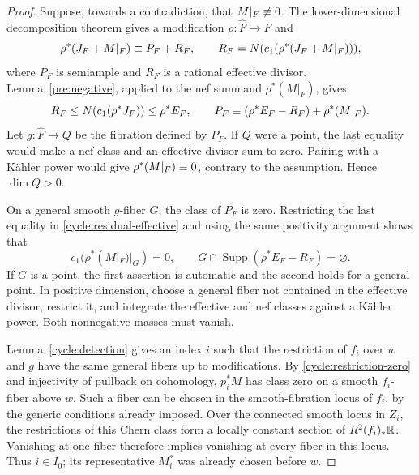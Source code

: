 \begin{proof}
Suppose, towards a contradiction, that $M|_F\not\equiv0$.  The
lower-dimensional decomposition theorem gives a modification
$\rho:\widehat F\to F$ and
\begin{equation}\label{cycle:inductive-decomposition}
 \rho^*(J_F+M|_F)\equiv P_F+R_F,
 \qquad R_F=N(c_1(\rho^*(J_F+M|_F))),
\end{equation}
where $P_F$ is semiample and $R_F$ is a rational effective divisor.
Lemma~\ref{pre:negative}, applied to the nef summand $\rho^*(M|_F)$,
gives
\begin{equation}\label{cycle:residual-effective}
 R_F\leq N(c_1(\rho^*J_F))\leq\rho^*E_F,
 \qquad
 P_F\equiv(\rho^*E_F-R_F)+\rho^*(M|_F).
\end{equation}
Let $g:\widehat F\to Q$ be the fibration defined by $P_F$.  If
$Q$ were a point, the last equality would make a nef class and an
effective divisor sum to zero.  Pairing with a K\"ahler power would
give $\rho^*(M|_F)\equiv0$, contrary to the assumption.  Hence
$\dim Q>0$.

On a general smooth $g$-fiber $G$, the class of $P_F$ is zero.
Restricting the last equality in
\eqref{cycle:residual-effective} and using the same positivity
argument shows that
\begin{equation}\label{cycle:restriction-zero}
 c_1(\rho^*(M|_F)|_G)=0,
 \qquad
 G\cap\operatorname{Supp}(\rho^*E_F-R_F)=\varnothing.
\end{equation}
If $G$ is a point, the first assertion is automatic and the second
holds for a general point.  In positive dimension, choose a general
fiber not contained in the effective divisor, restrict it, and
integrate the effective and nef classes against a K\"ahler power.
Both nonnegative masses must vanish.

Lemma~\ref{cycle:detection} gives an index $i$ such that the restriction
of $f_i$ over $w$ and $g$ have the same general fibers up to modifications.  By
\eqref{cycle:restriction-zero} and injectivity of pullback on
cohomology, $p_i^*M$ has class zero on a smooth $f_i$-fiber above
$w$.  Such a fiber can be chosen in the smooth-fibration locus of
$f_i$, by the generic conditions already imposed.  Over the
connected smooth locus in $Z_i$, the restrictions of this Chern
class form a locally constant section of $R^2(f_i)_*\mathbb R$.  Vanishing
at one fiber therefore implies vanishing at every fiber in this
locus.  Thus $i\in I_0$; its representative $M_i^*$ was already
chosen before $w$.


\end{proof}
